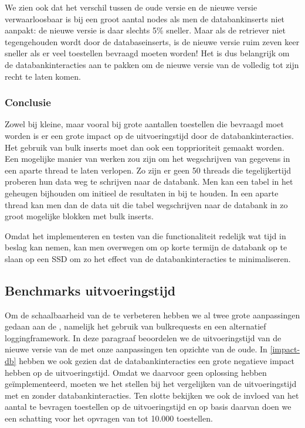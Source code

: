 We zien ook dat het verschil tussen de oude versie en de nieuwe versie verwaarloosbaar is bij een groot aantal nodes als men de databankinserts niet aanpakt:
de nieuwe versie is daar slechts 5\% sneller.
Maar als de retriever niet tegengehouden wordt door de databaseinserts, is de nieuwe versie ruim zeven keer sneller als er veel toestellen bevraagd moeten worden!
Het is dus belangrijk om de databankinteracties aan te pakken om de nieuwe versie van de \nwmretriever{} volledig tot zijn recht te laten komen.

\subsubsection{Conclusie}

Zowel bij kleine, maar vooral bij grote aantallen toestellen die bevraagd moet worden is er een grote impact op de uitvoeringstijd door de databankinteracties.
Het gebruik van bulk inserts moet dan ook een topprioriteit gemaakt worden.
Een mogelijke manier van werken zou zijn om het wegschrijven van gegevens in een aparte thread te laten verlopen.
Zo zijn er geen 50 threads die tegelijkertijd proberen hun data weg te schrijven naar de databank.
Men kan een tabel in het geheugen bijhouden om initieel de resultaten in bij te houden.
In een aparte thread kan men dan de data uit die tabel wegschrijven naar de databank in zo groot mogelijke blokken met bulk inserts.

Omdat het implementeren en testen van die functionaliteit redelijk wat tijd in beslag kan nemen,
kan men overwegen om op korte termijn de databank op te slaan op een SSD om zo het effect van de databankinteracties te minimaliseren.


\subsection{Benchmarks uitvoeringstijd}
\label{uitvoeringstijd-vwall}

Om de schaalbaarheid van de \nwmretriever{} te verbeteren hebben we al twee grote aanpassingen gedaan aan de \nwmretriever{},
namelijk het gebruik van bulkrequests en een alternatief loggingframework.
In deze paragraaf beoordelen we de uitvoeringstijd van de nieuwe versie van de \nwmretriever{} met onze aanpassingen ten opzichte van de oude.
In \cref{impact-db} hebben we ook gezien dat de databankinteracties een grote negatieve impact hebben op de uitvoeringstijd.
Omdat we daarvoor geen oplossing hebben geïmplementeerd, moeten we het stellen bij het vergelijken van de uitvoeringstijd met en zonder databankinteracties.
Ten slotte bekijken we ook de invloed van het aantal te bevragen toestellen op de uitvoeringstijd en op basis daarvan
doen we een schatting voor het opvragen van tot 10.000 toestellen.{}

